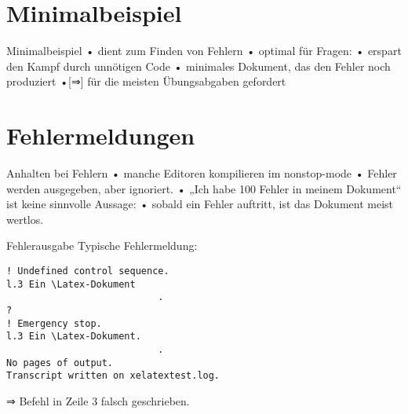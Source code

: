 \section{Minimalbeispiel}
\begin{frame}{Minimalbeispiel}
• dient zum Finden von Fehlern
• optimal für Fragen:
• erspart den Kampf durch unnötigen Code
• minimales Dokument, das den Fehler noch produziert
•[⇒] für die meisten Übungsabgaben gefordert
\•
\end{frame}


\section{Fehlermeldungen}

\begin{frame}{Anhalten bei Fehlern}
• manche Editoren kompilieren im nonstop-mode
• Fehler werden ausgegeben, aber ignoriert.
• „Ich habe 100 Fehler in meinem Dokument“ ist keine sinnvolle Aussage:
• sobald ein Fehler auftritt, ist das Dokument meist wertlos.
\•
\end{frame}


\begin{frame}[fragile]{Fehlerausgabe}
Typische Fehlermeldung:
\begin{lstlisting}
! Undefined control sequence.
l.3 Ein \Latex-Dokument
                           .
? 
! Emergency stop.
l.3 Ein \Latex-Dokument.
                           .
No pages of output.
Transcript written on xelatextest.log.
\end{lstlisting}
⇒ Befehl in Zeile 3 falsch geschrieben.
\end{frame}

